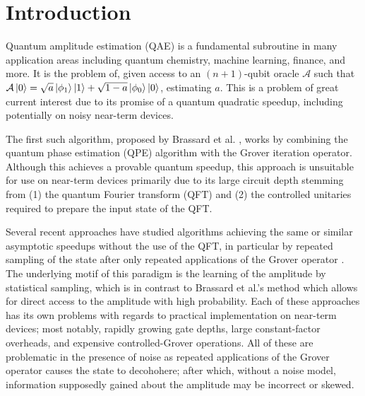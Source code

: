 
\section{Introduction}

Quantum amplitude estimation (QAE) is a fundamental subroutine in many application areas including quantum chemistry, machine learning, finance, and more. It is the problem of,\textbf{} given access to an $(n+1)$-qubit oracle $\mathcal{A}$ such that $\mathcal{A} \ket{0} = \sqrt{a} \ket{\phi_1} \ket{1} + \sqrt{1-a} \ket{\phi_0} \ket{0}$, estimating $a$. This is a problem of great current interest due to its promise of a quantum quadratic speedup, including potentially on noisy near-term devices.


The first such algorithm, proposed by Brassard et al. \cite{brassard_2002_q_amp_amp}, works by combining the quantum phase estimation (QPE) algorithm \cite{kitaev_1995_mmts_abelian_stab} with the Grover iteration operator. Although this achieves a provable quantum speedup, this approach is unsuitable for use on near-term devices primarily due to its large circuit depth stemming from (1) the quantum Fourier transform (QFT) \cite{coppersmith_2002_approximate_ft_for_q_factoring} and (2) the controlled unitaries required to prepare the input state of the QFT.

Several recent approaches have studied algorithms achieving the same or similar asymptotic speedups without the use of the QFT, in particular by repeated sampling of the state after only repeated applications of the Grover operator \cite{aaronson_2021_q_approx_counting, suzuki_2020_amp_without_phase, wie_2019_simpler_q_counting}. The underlying motif of this paradigm is the learning of the amplitude by statistical sampling, which is in contrast to Brassard et al.'s method which allows for direct access to the amplitude with high probability. Each of these approaches has its own problems with regards to practical implementation on near-term devices; most notably, rapidly growing gate depths, large constant-factor overheads, and expensive controlled-Grover operations. All of these are problematic in the presence of noise as repeated applications of the Grover operator causes the state to decohohere; after which, without a noise model, information supposedly gained about the amplitude may be incorrect or skewed.

